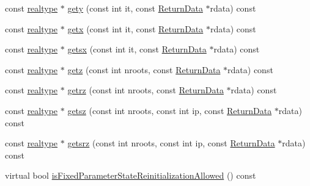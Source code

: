 \begin{DoxyCompactItemize}
\item 
const \mbox{\hyperlink{namespaceamici_a1bdce28051d6a53868f7ccbf5f2c14a3}{realtype}} $\ast$ \mbox{\hyperlink{classamici_1_1_model_aee6c7b534a091180c01aabb3be44a216}{gety}} (const int it, const \mbox{\hyperlink{classamici_1_1_return_data}{Return\+Data}} $\ast$rdata) const
\item 
const \mbox{\hyperlink{namespaceamici_a1bdce28051d6a53868f7ccbf5f2c14a3}{realtype}} $\ast$ \mbox{\hyperlink{classamici_1_1_model_abefad4b8b4ba76bad66f57504affca9b}{getx}} (const int it, const \mbox{\hyperlink{classamici_1_1_return_data}{Return\+Data}} $\ast$rdata) const
\item 
const \mbox{\hyperlink{namespaceamici_a1bdce28051d6a53868f7ccbf5f2c14a3}{realtype}} $\ast$ \mbox{\hyperlink{classamici_1_1_model_ae808a142aab292ef1b424bc3a0d924a0}{getsx}} (const int it, const \mbox{\hyperlink{classamici_1_1_return_data}{Return\+Data}} $\ast$rdata) const
\item 
const \mbox{\hyperlink{namespaceamici_a1bdce28051d6a53868f7ccbf5f2c14a3}{realtype}} $\ast$ \mbox{\hyperlink{classamici_1_1_model_a30571e418f94ca61b8df2b355e46ee1a}{getz}} (const int nroots, const \mbox{\hyperlink{classamici_1_1_return_data}{Return\+Data}} $\ast$rdata) const
\item 
const \mbox{\hyperlink{namespaceamici_a1bdce28051d6a53868f7ccbf5f2c14a3}{realtype}} $\ast$ \mbox{\hyperlink{classamici_1_1_model_ab2a9be3bb641741a52ddc48fcd9aa143}{getrz}} (const int nroots, const \mbox{\hyperlink{classamici_1_1_return_data}{Return\+Data}} $\ast$rdata) const
\item 
const \mbox{\hyperlink{namespaceamici_a1bdce28051d6a53868f7ccbf5f2c14a3}{realtype}} $\ast$ \mbox{\hyperlink{classamici_1_1_model_a78863f621eda7016ab7136a357dacdaf}{getsz}} (const int nroots, const int ip, const \mbox{\hyperlink{classamici_1_1_return_data}{Return\+Data}} $\ast$rdata) const
\item 
const \mbox{\hyperlink{namespaceamici_a1bdce28051d6a53868f7ccbf5f2c14a3}{realtype}} $\ast$ \mbox{\hyperlink{classamici_1_1_model_a49336e5923942fc5b4b26d6facf90b1d}{getsrz}} (const int nroots, const int ip, const \mbox{\hyperlink{classamici_1_1_return_data}{Return\+Data}} $\ast$rdata) const
\item 
virtual bool \mbox{\hyperlink{classamici_1_1_model_aee70a0075a3b36896dee7ba80415df3c}{is\+Fixed\+Parameter\+State\+Reinitialization\+Allowed}} () const
\end{DoxyCompactItemize}
